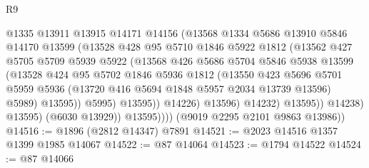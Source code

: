 \begin{lexlean}{R9}
\begin{coremodule}
                              @1335
                              @13911
                              @13915
                              @14171
                              @14156
                              (@13568
                                @1334
                                @5686
                                @13910
                                @5846
                                @14170
                                @13599
                                (@13528
                                  @428
                                  @95
                                  @5710
                                  @1846
                                  @5922
                                  @1812
                                  (@13562
                                    @427
                                    @5705
                                    @5709
                                    @5939
                                    @5922
                                    (@13568
                                      @426
                                      @5686
                                      @5704
                                      @5846
                                      @5938
                                      @13599
                                      (@13528
                                        @424
                                        @95
                                        @5702
                                        @1846
                                        @5936
                                        @1812
                                        (@13550
                                          @423
                                          @5696
                                          @5701
                                          @5959
                                          @5936
                                          (@13720 @416 @5694 @1848 @5957 @2034 @13739 @13596)
                                          @5989)
                                        @13595))
                                    @5995)
                                  @13595))
                              @14226)
                            @13596)
                          @14232)
                        @13595))
                    @14238)
                  @13595)
                (@6030 @13929))
              @13595))))
      (@9019 @2295 @2101 @9863 @13986))
@14516 := @1896 (@2812 @14347) @7891
@14521 := @2023 @14516 @1357 @1399 @1985 @14067
@14522 := @87 @14064
@14523 := @1794 @14522
@14524 := @87 @14066

\end{coremodule}
\end{lexlean}
